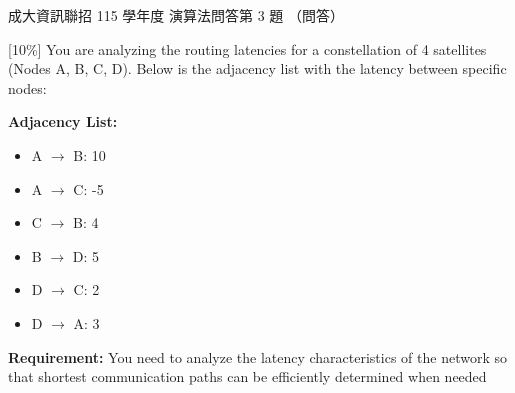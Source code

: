 \begin{pastexam}[label={px:ncku-115-prog-16}]{成大資訊聯招 115 學年度 演算法問答第 3 題}
（問答）

[10\%] You are analyzing the routing latencies for a constellation of 4 satellites (Nodes A, B, C, D).
Below is the adjacency list with the latency between specific nodes:

\textbf{Adjacency List:}
\begin{itemize}[label=$\blacksquare$,nosep]
\item A $\to$ B: 10
\item A $\to$ C: -5
\item C $\to$ B: 4
\item B $\to$ D: 5
\item D $\to$ C: 2
\item D $\to$ A: 3
\end{itemize}

\textbf{Requirement:} You need to analyze the latency characteristics of the network so that shortest
communication paths can be efficiently determined when needed


\end{pastexam}
